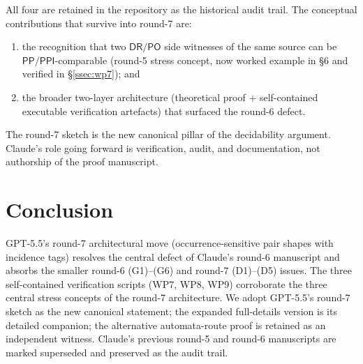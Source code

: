 \documentclass[11pt]{article}
\theoremstyle{definition}
\theoremstyle{remark}
\newcommand{\DR}{\mathsf{DR}}
\newcommand{\PO}{\mathsf{PO}}
\newcommand{\PP}{\mathsf{PP}}
\newcommand{\PPI}{\mathsf{PPI}}
\begin{document}
All four are retained in the repository as the historical audit
trail.  The conceptual contributions that survive into round-7 are:
\begin{enumerate}
\item the recognition that two $\DR/\PO$ side witnesses of the same
source can be $\PP/\PPI$-comparable (round-5 stress concept, now
worked example in \cite{GPT55Round7Sketch} \S6 and verified in
\S\ref{ssec:wp7}); and
\item the broader two-layer architecture (theoretical proof +
self-contained executable verification artefacts) that surfaced the
round-6 defect.
\end{enumerate}

The round-7 sketch is the new canonical pillar of the decidability
argument.  Claude's role going forward is verification, audit, and
documentation, not authorship of the proof manuscript.

\section{Conclusion}

GPT-5.5's round-7 architectural move (occurrence-sensitive pair
shapes with incidence tags) resolves the central defect of Claude's
round-6 manuscript and absorbs the smaller round-6 (G1)--(G6) and
round-7 (D1)--(D5) issues.  The three self-contained verification
scripts (WP7, WP8, WP9) corroborate the three central stress concepts
of the round-7 architecture.  We adopt GPT-5.5's round-7 sketch as
the new canonical statement; the expanded full-details version is
its detailed companion; the alternative automata-route proof is
retained as an independent witness.  Claude's previous round-5 and
round-6 manuscripts are marked superseded and preserved as the
audit trail.
\end{document}
